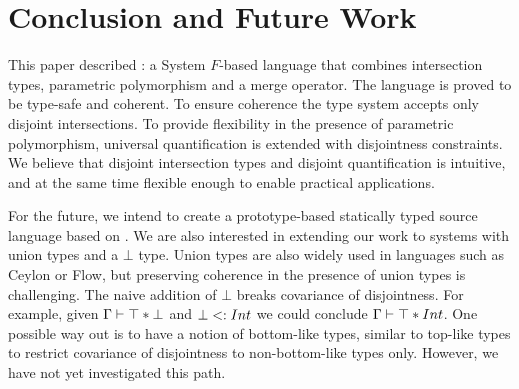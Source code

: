 \section{Conclusion and Future Work}
\label{sec:conclusion}

This paper described \name: a System $F$-based language that combines
intersection types, parametric polymorphism and a merge operator.
The language is proved to be type-safe and coherent.
To ensure coherence the type system accepts only
disjoint intersections. To provide flexibility in the presence of parametric polymorphism,
universal quantification is extended with
disjointness constraints. We believe that disjoint intersection types
and disjoint quantification is intuitive, and at the same time
flexible enough to enable practical applications.


For the future, we intend to create a prototype-based statically typed
source language based on \name.
We are also interested in extending our work to systems with union types and
a $\bot$ type. Union types are also widely used in languages such as
Ceylon or Flow, but preserving coherence in the presence of union
types is challenging. The naive addition of $\bot$ breaks
covariance of disjointness. For example, given $\Gamma \vdash \top * \bot$ and 
$\bot <: Int$ we could conclude  $\Gamma \vdash \top *
  Int$. One possible way out is to have a notion of bottom-like
types, similar to top-like types to restrict covariance of
disjointness to non-bottom-like types only. However, we have not yet
investigated this path. 




